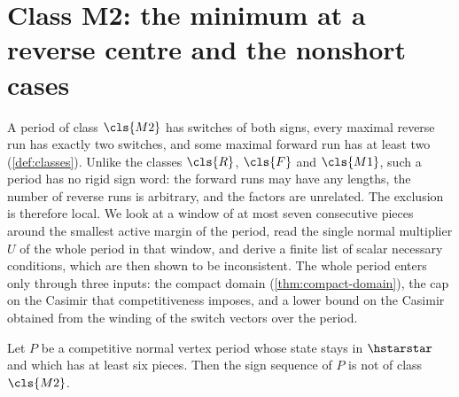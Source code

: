 \section{Class M2: the minimum at a reverse centre and the nonshort cases}\label{sec:mixed}

A period of class $\cls{M2}$ has switches of both signs, every maximal reverse run has exactly two
switches, and some maximal forward run has at least two (\cref{def:classes}). Unlike the classes
$\cls{R}$, $\cls{F}$ and $\cls{M1}$, such a period has no rigid sign word: the forward runs may have
any lengths, the number of reverse runs is arbitrary, and the factors are unrelated. The exclusion
is therefore local. We look at a window of at most seven consecutive pieces around the smallest
active margin of the period, read the single normal multiplier $U$ of the whole period in that
window, and derive a finite list of scalar necessary conditions, which are then shown to be
inconsistent. The whole period enters only through three inputs: the compact domain
(\cref{thm:compact-domain}), the cap on the Casimir that competitiveness imposes, and a lower bound
on the Casimir obtained from the winding of the switch vectors over the period.

\begin{theorem}\label{thm:class-M2}
Let $P$ be a competitive normal vertex period whose state stays in $\hstarstar$ and which has at
least six pieces. Then the sign sequence of $P$ is not of class $\cls{M2}$.
\end{theorem}

